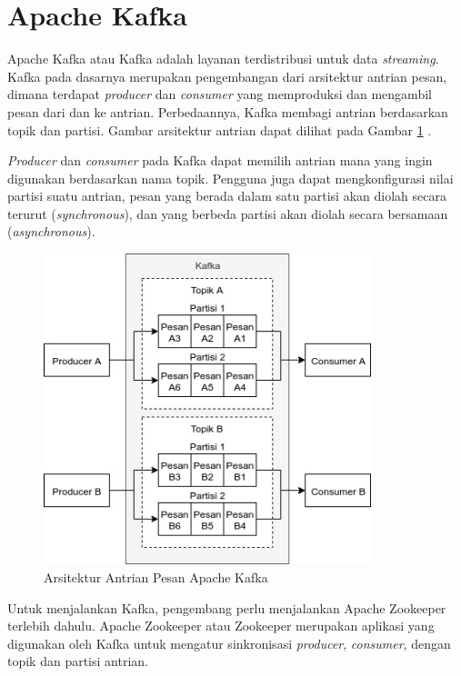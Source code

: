 \section{Apache Kafka}
\par Apache Kafka atau Kafka adalah layanan terdistribusi untuk data \textit{streaming}. Kafka pada dasarnya merupakan pengembangan dari arsitektur antrian pesan, dimana terdapat \textit{producer} dan \textit{consumer} yang memproduksi dan mengambil pesan dari dan ke antrian. Perbedaannya, Kafka membagi antrian berdasarkan topik dan partisi. Gambar arsitektur antrian dapat dilihat pada Gambar \ref{img:arsitektur-mq_kafka} \cite{kafka-online}.
\par \textit{Producer} dan \textit{consumer} pada Kafka dapat memilih antrian mana yang ingin digunakan berdasarkan nama topik. Pengguna juga dapat mengkonfigurasi nilai partisi suatu antrian, pesan yang berada dalam satu partisi akan diolah secara terurut (\textit{synchronous}), dan yang berbeda partisi akan diolah secara bersamaan (\textit{asynchronous}).
\begin{figure}[H]
	\centering\includegraphics[width=0.85\textwidth]{bab2/img/arsitektur-mq_kafka.jpg}
	\caption{Arsitektur Antrian Pesan Apache Kafka}
	\label{img:arsitektur-mq_kafka}
\end{figure}
\par Untuk menjalankan Kafka, pengembang perlu menjalankan Apache Zookeeper terlebih dahulu. Apache Zookeeper atau Zookeeper merupakan aplikasi yang digunakan oleh Kafka untuk mengatur sinkronisasi \textit{producer}, \textit{consumer}, dengan topik dan partisi antrian.
